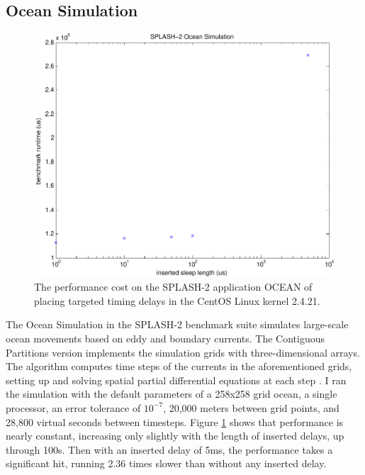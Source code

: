 \documentclass[12pt,conference]{IEEEtran}
\begin{document}
\subsection{Ocean Simulation}
\begin{figure}
\centering
\includegraphics[width=\columnwidth]{ocean}
\caption{The performance cost on the SPLASH-2 application OCEAN of placing targeted timing delays in the CentOS Linux kernel 2.4.21.}
\label{fig_ocean}
\end{figure}
The Ocean Simulation in the SPLASH-2 benchmark suite simulates large-scale ocean movements based on eddy and boundary currents.  The Contiguous Partitions version implements the simulation grids with three-dimensional arrays.  The algorithm computes time steps of the currents in the aforementioned grids, setting up and solving spatial partial differential equations at each step \cite{Singh1992}.  I ran the simulation with the default parameters of a 258x258 grid ocean, a single processor, an error tolerance of $10^{-7}$, 20,000 meters between grid points, and 28,800 virtual seconds between timesteps.  Figure \ref{fig_ocean} shows that performance is nearly constant, increasing only slightly with the length of inserted delays, up through 100{\textmu}s.  Then with an inserted delay of 5ms, the performance takes a significant hit, running 2.36 times slower than without any inserted delay.
\end{document}
